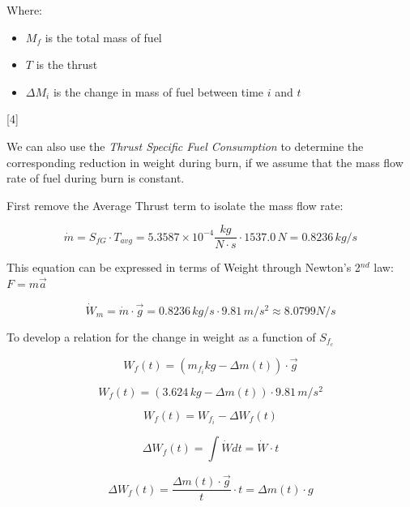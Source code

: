 \documentclass[]{article}
\providecommand{\tightlist}{%
  \setlength{\itemsep}{0pt}\setlength{\parskip}{0pt}}
\begin{document}
Where:

\begin{itemize}
\tightlist
\item
  \(M_f\) is the total mass of fuel
\item
  \(T\) is the thrust
\item
  \(\Delta M_i\) is the change in mass of fuel between time \(i\) and
  \(t\)
\end{itemize}

{[}4{]}

We can also use the \emph{Thrust Specific Fuel Consumption} to determine
the corresponding reduction in weight during burn, if we assume that the
mass flow rate of fuel during burn is constant.

First remove the Average Thrust term to isolate the mass flow rate:

\begin{equation}
\dot{m} = S_{fG} \cdot T_{avg} = 5.3587 \times 10^{-4} \dfrac{kg}{N \cdot s} \cdot 1537.0 \, N  = 0.8236 \, kg/s 
\end{equation}

This equation can be expressed in terms of Weight through Newton's
2\(^{nd}\) law: \(F = m\vec{a}\)

\begin{equation}
\dot{W}_m = \dot{m} \cdot \vec{g} = 0.8236 \, kg/s \cdot 9.81 \, m/s^2 \approx 8.0799 N/s 
\end{equation}

To develop a relation for the change in weight as a function of
\(S_{f_c}\)

\begin{equation} 
W_f(t) = (m_{f_i} kg - \Delta m(t)) \cdot \vec{g} 
\end{equation}

\begin{equation}
W_f(t) = (3.624 \, kg - \Delta m(t)) \cdot 9.81 \, m/s^2 
\end{equation}

\begin{equation}
W_f(t) = W_{f_i} - \Delta W_f(t)
\end{equation}

\begin{equation}
\Delta W_f (t) = \int \dot{W} dt = \dot{W}\cdot t
\end{equation}

\begin{equation}
\Delta W_f (t) = \dfrac{\Delta m(t) \cdot \vec{g}}{t}\cdot t = \Delta m (t) \cdot g 
\end{equation}
\end{document}
